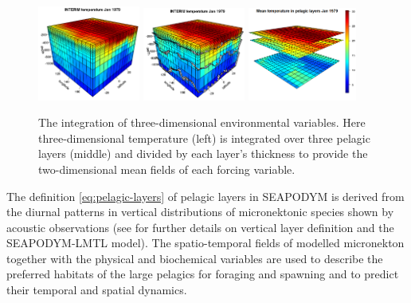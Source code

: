 \begin{figure}
 \centering
 \includegraphics[width=0.3\textwidth]{chapter1/figs/T-3d-grid}
 \includegraphics[width=0.3\textwidth]{chapter1/figs/T-3d-grid-zeu}
 \includegraphics[width=0.32\textwidth]{chapter1/figs/T-2d-grid}
 \caption{The integration of three-dimensional environmental variables. Here three-dimensional temperature (left) is integrated over three pelagic layers (middle) and divided by each layer's thickness to provide the two-dimensional mean fields of each forcing variable.}
 \label{fig:forcing_integration}
\end{figure}

The definition \eqref{eq:pelagic-layers} of pelagic layers in SEAPODYM is derived from the diurnal patterns in vertical distributions of micronektonic species shown by acoustic observations (see \citet{Lehodey2015} for further details on vertical layer definition and the SEAPODYM-LMTL model). The spatio-temporal fields of modelled micronekton together with the physical and biochemical variables are used to describe the preferred habitats of the large pelagics for foraging and spawning and to predict their temporal and spatial dynamics. 


